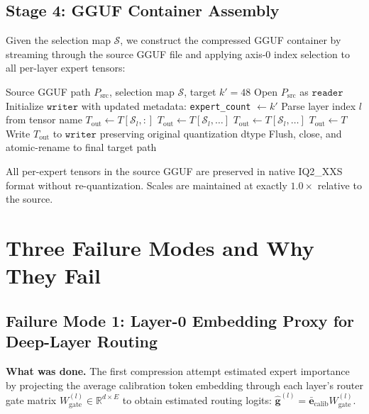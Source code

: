 \documentclass[10pt]{article}
\newcommand{\MAPLE}{\textsc{MAPLE}}
\newcommand{\R}{\mathbb{R}}
\begin{document}
\subsection{Stage 4: GGUF Container Assembly}
Given the selection map $\mathcal{S}$, we construct the compressed GGUF container by streaming through the source GGUF file and applying axis-0 index selection to all per-layer expert tensors:

\begin{algorithm}[H]
\caption{\MAPLE{} Container Assembly}
\begin{algorithmic}[1]
\Require Source GGUF path $P_\text{src}$, selection map $\mathcal{S}$, target $k' = 48$
\State Open $P_\text{src}$ as $\texttt{reader}$
\State Initialize $\texttt{writer}$ with updated metadata: \texttt{expert\_count} $\leftarrow k'$
  \State Parse layer index $l$ from tensor name
    \State $T_\text{out} \leftarrow T[\mathcal{S}_l, :]$ 
    \State $T_\text{out} \leftarrow T[\mathcal{S}_l, \ldots]$ 
    \State $T_\text{out} \leftarrow T[\mathcal{S}_l, \ldots]$ 
  \Else
    \State $T_\text{out} \leftarrow T$ 
  \EndIf
  \State Write $T_\text{out}$ to $\texttt{writer}$ preserving original quantization dtype
\EndFor
\State Flush, close, and atomic-rename to final target path
\end{algorithmic}
\end{algorithm}

All per-expert tensors in the source GGUF are preserved in native IQ2\_XXS format without re-quantization. Scales are maintained at exactly $1.0\times$ relative to the source.

\section{Three Failure Modes and Why They Fail}
\label{sec:failures}

\subsection{Failure Mode 1: Layer-0 Embedding Proxy for Deep-Layer Routing}
\textbf{What was done.} The first compression attempt estimated expert importance by projecting the average calibration token embedding through each layer's router gate matrix $W_\text{gate}^{(l)} \in \R^{d \times E}$ to obtain estimated routing logits: $\hat{\mathbf{g}}^{(l)} = \bar{\mathbf{e}}_\text{calib} W_\text{gate}^{(l)}$.
\end{document}
